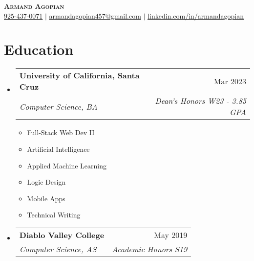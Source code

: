 \documentclass[letterpaper,11pt]{article}
\makeatletter
\newcommand{\resumeSubheading}[4]{
  \vspace{-2pt}\item
    \begin{tabular*}{0.97\textwidth}[t]{l@{\extracolsep{\fill}}r}
      \textbf{#1} & #2 \\
      \textit{\small#3} & \textit{\small #4} \\
    \end{tabular*}\vspace{-7pt}
}
\newcommand{\resumeSubHeadingListStart}{\begin{itemize}[leftmargin=0.15in, label={}]}
\newcommand{\resumeSubHeadingListEnd}{\end{itemize}}
\makeatother
\begin{document}

\begin{center}
    \textbf{\Huge \scshape Armand Agopian} \\ \vspace{1pt}
    \small \href{tel:+19254370071}{925-437-0071} $|$ 
    \href{mailto:armandagopian457@gmail.com}{\underline{armandagopian457@gmail.com}} $|$ 
    \href{https://linkedin.com/in/armandagopian}{\underline{linkedin.com/in/armandagopian}}
\end{center}

\vspace{-0.8cm}
\section{Education}
  \resumeSubHeadingListStart
    \resumeSubheading
      {University of California, Santa Cruz}{Mar 2023}
      {Computer Science, BA}{Dean's Honors W23 - 3.85 GPA}
      \begin{multicols}{3}
        \begin{itemize}
            \item Full-Stack Web Dev II
            \item Artificial Intelligence
            \item Applied Machine Learning
            \item Logic Design
            \item Mobile Apps
            \item Technical Writing
        \end{itemize}
      \end{multicols}
      \vspace{-1\baselineskip}
    \resumeSubheading
      {Diablo Valley College}{May 2019}
      {Computer Science, AS}{Academic Honors S19}
  \resumeSubHeadingListEnd

\end{document}

